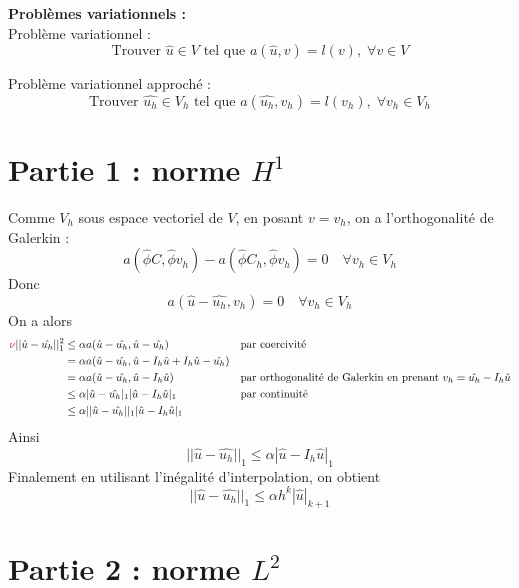\documentclass[french]{article}
\begin{document}
	\textbf{Problèmes variationnels :} \\
	
	Problème variationnel :
	$$\text{Trouver } \hat{u}\in V \text{ tel que } a(\hat{u},v)=l(v), \;\forall v\in V$$
	
	Problème variationnel approché :
	$$\text{Trouver } \hat{u_h}\in V_h \text{ tel que } a(\hat{u_h},v_h)=l(v_h), \;\forall v_h\in V_h$$
	
	\section{Partie 1 : norme $H^1$}
	
	Comme $V_h$ sous espace vectoriel de $V$, en posant $v=v_h$, on a l'orthogonalité de Galerkin :
	$$a(\hat{\phi}C,\hat{\phi}v_h)-a(\hat{\phi}C_h,\hat{\phi}v_h)=0 \quad \forall v_h\in V_h$$
	Donc \color{red}{(ATTENTION : Abus de notation sur $v_h$ !)}\color{black}
	$$a(\hat{u}-\hat{u_h},v_h)=0 \quad \forall v_h\in V_h$$
	On a alors
	\begin{align*}
		\color{red}{\nu}\color{black}||\hat{u}-\hat{u_h}||_1^2&\le\alpha a(\hat{u}-\hat{u_h},\hat{u}-\hat{u_h}) &&\text{par coercivité} \\
		&=\alpha a(\hat{u}-\hat{u_h},\hat{u}-I_h\hat{u}+I_h\hat{u}-\hat{u_h}) \\
		&=\alpha a(\hat{u}-\hat{u_h},\hat{u}-I_h\hat{u}) &&\text{par orthogonalité de Galerkin en prenant } v_h=\hat{u_h}-I_h\hat{u} \\
		&\le\alpha |\hat{u}-\hat{u_h}|_1|\hat{u}-I_h\hat{u}|_1 &&\text{par continuité} \\
		&\le\alpha ||\hat{u}-\hat{u_h}||_1|\hat{u}-I_h\hat{u}|_1
	\end{align*}
	Ainsi
	$$||\hat{u}-\hat{u_h}||_1\le\alpha|\hat{u}-I_h\hat{u}|_1$$
	Finalement en utilisant l'inégalité d'interpolation, on obtient
	\begin{equation}
		\boxed{||\hat{u}-\hat{u_h}||_1\le\alpha h^k|\hat{u}|_{k+1}}
		\label{norme_H1}
	\end{equation} 

	\section{Partie 2 : norme $L^2$}
	
\end{document}
